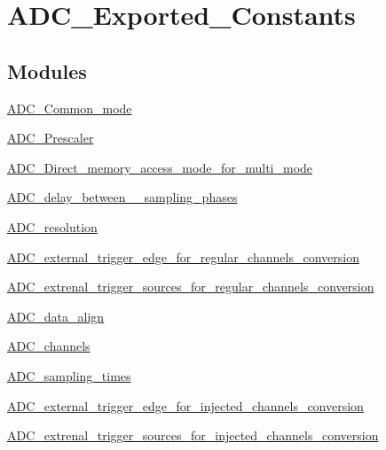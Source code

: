 \hypertarget{group___a_d_c___exported___constants}{\section{A\-D\-C\-\_\-\-Exported\-\_\-\-Constants}
\label{group___a_d_c___exported___constants}
}
\subsection*{Modules}
\begin{DoxyCompactItemize}
\item 
\hyperlink{group___a_d_c___common__mode}{A\-D\-C\-\_\-\-Common\-\_\-mode}
\item 
\hyperlink{group___a_d_c___prescaler}{A\-D\-C\-\_\-\-Prescaler}
\item 
\hyperlink{group___a_d_c___direct__memory__access__mode__for__multi__mode}{A\-D\-C\-\_\-\-Direct\-\_\-memory\-\_\-access\-\_\-mode\-\_\-for\-\_\-multi\-\_\-mode}
\item 
\hyperlink{group___a_d_c__delay__between__2__sampling__phases}{A\-D\-C\-\_\-delay\-\_\-between\-\_\-\_\-sampling\-\_\-phases}
\item 
\hyperlink{group___a_d_c__resolution}{A\-D\-C\-\_\-resolution}
\item 
\hyperlink{group___a_d_c__external__trigger__edge__for__regular__channels__conversion}{A\-D\-C\-\_\-external\-\_\-trigger\-\_\-edge\-\_\-for\-\_\-regular\-\_\-channels\-\_\-conversion}
\item 
\hyperlink{group___a_d_c__extrenal__trigger__sources__for__regular__channels__conversion}{A\-D\-C\-\_\-extrenal\-\_\-trigger\-\_\-sources\-\_\-for\-\_\-regular\-\_\-channels\-\_\-conversion}
\item 
\hyperlink{group___a_d_c__data__align}{A\-D\-C\-\_\-data\-\_\-align}
\item 
\hyperlink{group___a_d_c__channels}{A\-D\-C\-\_\-channels}
\item 
\hyperlink{group___a_d_c__sampling__times}{A\-D\-C\-\_\-sampling\-\_\-times}
\item 
\hyperlink{group___a_d_c__external__trigger__edge__for__injected__channels__conversion}{A\-D\-C\-\_\-external\-\_\-trigger\-\_\-edge\-\_\-for\-\_\-injected\-\_\-channels\-\_\-conversion}
\item 
\hyperlink{group___a_d_c__extrenal__trigger__sources__for__injected__channels__conversion}{A\-D\-C\-\_\-extrenal\-\_\-trigger\-\_\-sources\-\_\-for\-\_\-injected\-\_\-channels\-\_\-conversion}

\end{DoxyCompactItemize}

